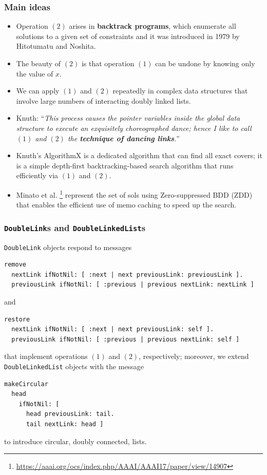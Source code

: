 \documentclass[10pt]{beamer}
\begin{document}
\begin{frame}[fragile]
\frametitle{Main ideas}

\begin{itemize}
  \item Operation $(2)$ arises in \textbf{backtrack programs}, which enumerate all 
  solutions to a given set of constraints and it was introduced in 1979 by Hitotumatu and Noshita.
  \item The beauty of $(2)$ is that operation $(1)$ can be undone by knowing only the value of $x$.
  \item We can apply $(1)$ and $(2)$ repeatedly in complex data structures that involve large 
  numbers of interacting doubly linked lists.
  \item Knuth: ``\emph{This process causes the pointer variables inside the global data structure to execute an 
    exquisitely choreographed dance; hence I like to call $(1)$ and $(2)$ the \textbf{technique of dancing links}.}''
  \item Knuth's AlgorithmX is a dedicated algorithm that can find all exact covers;
  	it is a simple depth-first backtracking-based search algorithm that runs
	efficiently via $(1)$ and $(2)$.
  \item Minato et al. \footnote{\url{https://aaai.org/ocs/index.php/AAAI/AAAI17/paper/view/14907}} 
  represent the set of sols using Zero-suppressed BDD (ZDD) that enables the efficient 
  use of memo caching to speed up the search.
\end{itemize}
\end{frame}

\begin{frame}[fragile]
\frametitle{\texttt{DoubleLink}s and \texttt{DoubleLinkedList}s}
\texttt{DoubleLink} objects respond to messages
\begin{verbatim}
remove
  nextLink ifNotNil: [ :next | next previousLink: previousLink ].
  previousLink ifNotNil: [ :previous | previous nextLink: nextLink ]
\end{verbatim}
and
\begin{verbatim}
restore
  nextLink ifNotNil: [ :next | next previousLink: self ].
  previousLink ifNotNil: [ :previous | previous nextLink: self ]
\end{verbatim}
that implement operations $(1)$ and $(2)$, respectively;
moreover, we extend \texttt{DoubleLinkedList} objects with the message
\begin{verbatim}
makeCircular
  head
    ifNotNil: [ 
      head previousLink: tail.
      tail nextLink: head ]
\end{verbatim}
to introduce circular, doubly connected, lists.
\end{frame}
\end{document}
